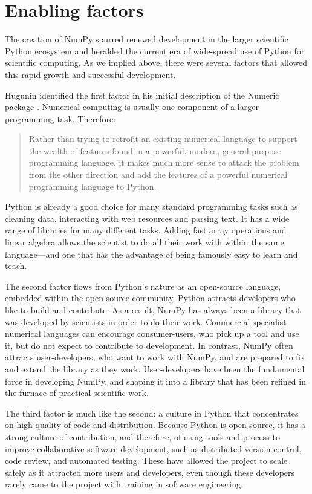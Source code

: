 \section*{Enabling factors}

The creation of NumPy spurred renewed development in the larger scientific
Python ecosystem and heralded the current era of wide-spread use of Python for
scientific computing.
As we implied above, there were several factors that allowed this rapid growth
and successful development.

Hugunin identified the first factor in his initial description of the Numeric
package \cite{Hugunin-whitepaper}.  Numerical computing is usually one
component of a larger programming task.  Therefore:

\begin{quote}
    Rather than trying to retrofit an existing numerical language to support
    the wealth of features found in a powerful, modern, general-purpose
    programming language, it makes much more sense to attack the problem from
    the other direction and add the features of a powerful numerical
    programming language to Python.
\end{quote}

Python is already a good choice for many standard programming tasks such as
cleaning data, interacting with web resources and parsing text.  It has a wide
range of libraries for many different tasks. Adding fast array operations and
linear algebra allows the scientist to do all their work with within the same
language---and one that has the advantage of being famously easy to learn and
teach.

The second factor flows from Python's nature as an open-source language,
embedded within the open-source community.  Python attracts developers who like
to build and contribute.  As a result, NumPy has always been a library that was
developed by scientists in order to do their work.  Commercial specialist
numerical languages can encourage consumer-users, who pick up a tool and use
it, but do not expect to contribute to development.  In contrast, NumPy often
attracts user-developers, who want to work with NumPy, and are prepared to fix
and extend the library as they work. User-developers have been the fundamental
force in developing NumPy, and shaping it into a library that has been refined
in the furnace of practical scientific work.

The third factor is much like the second: a culture in Python that concentrates
on high quality of code and distribution. Because Python is open-source, it has
a strong culture of contribution, and therefore, of using tools and process to
improve collaborative software development, such as distributed version
control, code review, and automated testing.  These have allowed the project to
scale safely as it attracted more users and developers, even though these
developers rarely came to the project with training in software engineering.


